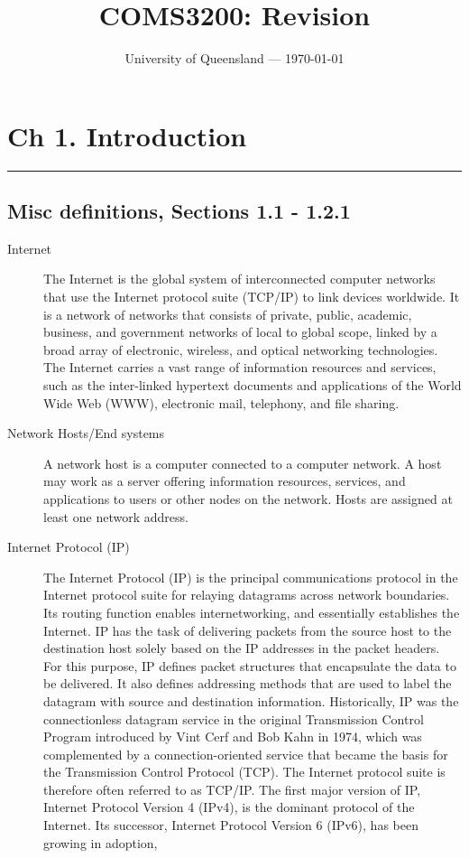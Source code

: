 \documentclass{article}
\title{COMS3200: Revision} %
\date{University of Queensland --- \today}
\begin{document}
\maketitle %

\section*{Ch 1. Introduction}
\noindent
\rule{\linewidth}{0.5mm}
\noindent

\subsection*{Misc definitions, Sections 1.1 - 1.2.1}
\begin{description}
    \item[Internet] The Internet is the global system of interconnected computer networks that use the Internet protocol suite (TCP/IP) to link devices worldwide. It is a network of networks that consists of private, public, academic, business, and government networks of local to global scope, linked by a broad array of electronic, wireless, and optical networking technologies. The Internet carries a vast range of information resources and services, such as the inter-linked hypertext documents and applications of the World Wide Web (WWW), electronic mail, telephony, and file sharing.
    
    \item[Network Hosts/End systems] A network host is a computer connected to a computer network. A host may work as a server offering information resources, services, and applications to users or other nodes on the network. Hosts are assigned at least one network address.
    
    \item[Internet Protocol (IP)] The Internet Protocol (IP) is the principal communications protocol in the Internet protocol suite for relaying datagrams across network boundaries. Its routing function enables internetworking, and essentially establishes the Internet. IP has the task of delivering packets from the source host to the destination host solely based on the IP addresses in the packet headers. For this purpose, IP defines packet structures that encapsulate the data to be delivered. It also defines addressing methods that are used to label the datagram with source and destination information. Historically, IP was the connectionless datagram service in the original Transmission Control Program introduced by Vint Cerf and Bob Kahn in 1974, which was complemented by a connection-oriented service that became the basis for the Transmission Control Protocol (TCP). The Internet protocol suite is therefore often referred to as TCP/IP. The first major version of IP, Internet Protocol Version 4 (IPv4), is the dominant protocol of the Internet. Its successor, Internet Protocol Version 6 (IPv6), has been growing in adoption, 


\end{description}
\end{document}
